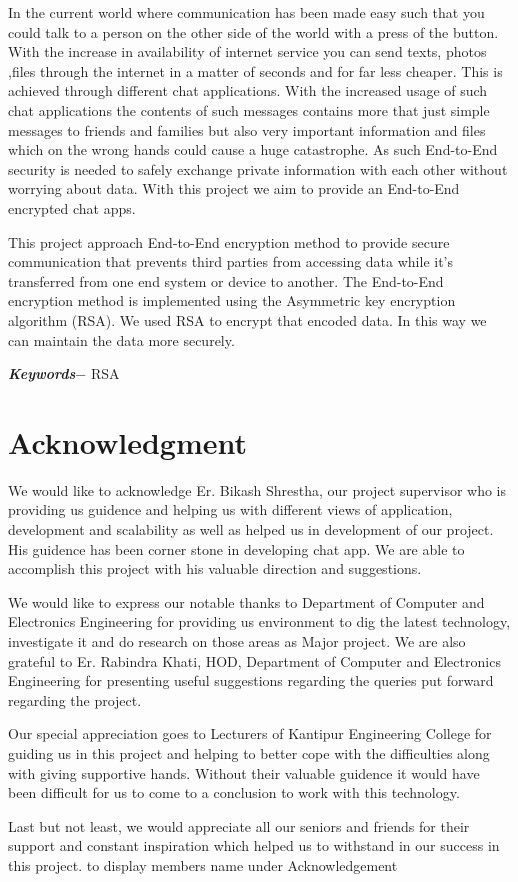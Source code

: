 In the current world where communication has been made easy such that you could talk to a person on the other side of the world with a press of the button. With the increase in availability of internet service you can send texts, photos ,files through the internet in a matter of seconds and for far less cheaper. This is achieved through different chat applications. With the increased usage of such chat applications the contents of such messages contains more that just simple messages to friends and families but also very important information and files which on the wrong hands could cause a huge catastrophe. As such End-to-End security is needed to safely exchange private information with each other without worrying about data. With this project we aim to provide an End-to-End encrypted chat apps.

This project approach End-to-End encryption method to provide  secure communication that prevents third parties from accessing data while it's transferred from one end system or device to another.
The End-to-End encryption method is implemented using the Asymmetric key encryption algorithm (RSA). We used RSA to encrypt that encoded data.
In this way we can maintain the data more securely.


\par
\textbf{\textit{Keywords$-$}} RSA

\chapter*{Acknowledgment}
We would like to acknowledge Er. Bikash Shrestha, our project supervisor who is providing us guidence and
helping us with different views of application, development and scalability as well as helped us in development of our project.
His guidence has been corner stone in developing chat app. We are able to accomplish this project with his valuable direction and suggestions.\par
We would like to express our notable thanks to Department of Computer and Electronics Engineering
for providing us environment to dig the latest technology, investigate it and do research on those areas as Major project.
We are also grateful to Er. Rabindra Khati, HOD, Department of Computer and Electronics Engineering
for presenting useful suggestions regarding the queries put forward regarding the project.\par
Our special appreciation goes to Lecturers of Kantipur Engineering College for guiding us in this project
and helping to better cope with the difficulties along with giving supportive hands. Without their
valuable guidence it would have been difficult for us to come to a conclusion to work with this technology.\par
Last but not least, we would appreciate all our seniors and friends for their support and constant inspiration which helped us to
withstand in our success in this project.
to display members name under Acknowledgement
\begin{flushright}
	\vskip -20pt
	\submittedBy
\end{flushright}



